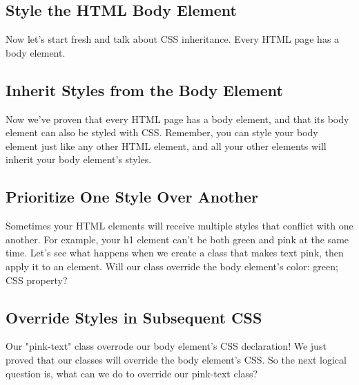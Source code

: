 \documentclass{article}%
\begin{document}
%
\subsection{Style the HTML Body Element}%
\label{subsec:StyletheHTMLBodyElement}%
Now let's start fresh and talk about CSS inheritance.\newline%
Every HTML page has a body element.\newline%

%
\subsection{Inherit Styles from the Body Element}%
\label{subsec:InheritStylesfromtheBodyElement}%
Now we've proven that every HTML page has a body element, and that its body element can also be styled with CSS.\newline%
Remember, you can style your body element just like any other HTML element, and all your other elements will inherit your body element's styles.\newline%

%
\subsection{Prioritize One Style Over Another}%
\label{subsec:PrioritizeOneStyleOverAnother}%
Sometimes your HTML elements will receive multiple styles that conflict with one another.\newline%
For example, your h1 element can't be both green and pink at the same time.\newline%
Let's see what happens when we create a class that makes text pink, then apply it to an element. Will our class override the body element's color: green; CSS property?\newline%

%
\subsection{Override Styles in Subsequent CSS}%
\label{subsec:OverrideStylesinSubsequentCSS}%
Our "pink{-}text" class overrode our body element's CSS declaration!\newline%
We just proved that our classes will override the body element's CSS. So the next logical question is, what can we do to override our pink{-}text class?\newline%

%
\end{document}
